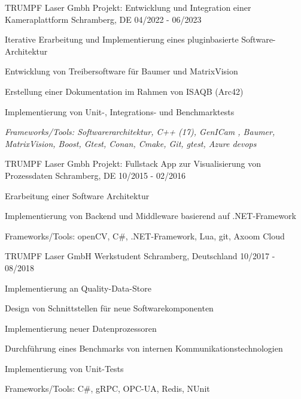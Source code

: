 \cventry
{TRUMPF Laser Gmbh} %
{Projekt: Entwicklung und Integration einer Kameraplattform} %
{Schramberg, DE} %
{04/2022 - 06/2023} %
\begin{cvitems}
	\item{Iterative Erarbeitung und Implementierung eines pluginbasierte Software-Architektur}
	\item{Entwicklung von Treibersoftware für Baumer und MatrixVision}
	\item{Erstellung einer Dokumentation im Rahmen von ISAQB (Arc42)}
	\item{Implementierung von Unit-, Integrations- und Benchmarktests}
	\item{\textit{Frameworks/Tools:  Softwarerarchitektur, C++ (17), GenICam , Baumer, MatrixVision, Boost, Gtest, Conan, Cmake, Git, gtest, Azure devops}}
\end{cvitems}

\cventry
{TRUMPF Laser Gmbh} %
{Projekt: Fullstack App zur Visualisierung von Prozessdaten} %
{Schramberg, DE} %
{10/2015 - 02/2016} %
\begin{cvitems}
	\item{Erarbeitung einer Software Architektur }
	\item{Implementierung von Backend und Middleware basierend auf .NET-Framework}
	\item{Frameworks/Tools: openCV, C\#, .NET-Framework,  Lua,  git, Axoom Cloud}
\end{cvitems}

\cventry
{TRUMPF Laser GmbH} %
{Werkstudent} %
{Schramberg, Deutschland} %
{10/2017 - 08/2018} %
\begin{cvitems}
\item{Implementierung an Quality-Data-Store}
\item{Design von Schnittstellen für neue Softwarekomponenten}
\item{Implementierung neuer Datenprozessoren}
\item{Durchführung eines Benchmarks von  internen Kommunikationstechnologien}
\item{Implementierung von Unit-Tests}
\item{Frameworks/Tools: C\#, gRPC, OPC-UA, Redis, NUnit}
\end{cvitems}
